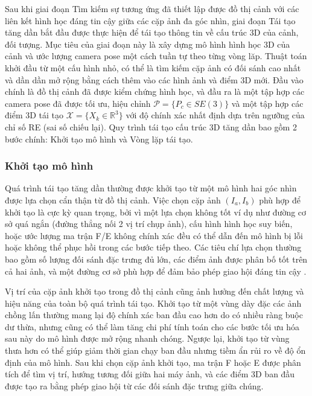 Sau khi giai đoạn Tìm kiếm sự tương ứng đã thiết lập được đồ thị cảnh với các liên kết hình học đáng tin cậy giữa các cặp ảnh đa góc nhìn, giai đoạn Tái tạo tăng dần bắt đầu được thực hiện để tái tạo thông tin về cấu trúc 3D của cảnh, đối tượng. Mục tiêu của giai đoạn này là xây dựng mô hình hình học 3D của cảnh và ước lượng camera pose một cách tuần tự theo từng vòng lăp. Thuật toán khởi đầu từ một cấu hình nhỏ, có thể là tìm kiếm cặp ảnh có đối sánh cao nhất và dần dần mở rộng bằng cách thêm vào các hình ảnh và điểm 3D mới. Đầu vào chính là đồ thị cảnh đã được kiểm chứng hình học, và đầu ra là một tập hợp các camera pose đã được tối ưu, hiệu chỉnh  $\mathcal{P} = \{P_c \in SE(3)\}$ và một tập hợp các điểm 3D tái tạo $\mathcal{X} = \{X_k \in \mathbb{R}^3\}$ với độ chính xác nhất định dựa trên ngưỡng của chỉ số RE (sai số chiếu lại). Quy trình tái tạo cấu trúc 3D tăng dần bao gồm 2 bước chính: Khởi tạo mô hình và Vòng lặp tái tạo.

\subsubsection{Khởi tạo mô hình }
Quá trình tái tạo tăng dần thường được khởi tạo từ một mô hình hai góc nhìn được lựa chọn cẩn thận từ đồ thị cảnh. Việc chọn cặp ảnh $(I_a, I_b)$ phù hợp để khởi tạo là cực kỳ quan trọng, bởi vì một lựa chọn không tốt ví dụ như đường cơ sở quá ngắn (đường thẳng nối 2 vị trí chụp ảnh), cấu hình hình học suy biến, hoặc ước lượng ma trận F/E không chính xác đều có thể dẫn đến mô hình bị lỗi hoặc không thể phục hồi trong các bước tiếp theo. Các tiêu chí lựa chọn thường bao gồm số lượng đối sánh đặc trưng đủ lớn, các điểm ảnh được phân bố tốt trên cả hai ảnh, và một đường cơ sở phù hợp để đảm bảo phép giao hội đáng tin cậy \cite{Beder06Determining, Snavely08Thesis}.

Vị trí của cặp ảnh khởi tạo trong đồ thị cảnh cũng ảnh hưởng đến chất lượng và hiệu năng của toàn bộ quá trình tái tạo. Khởi tạo từ một vùng dày đặc các ảnh chồng lấn thường mang lại độ chính xác ban đầu cao hơn do có nhiều ràng buộc dư thừa, nhưng cũng có thể làm tăng chi phí tính toán cho các bước tối ưu hóa sau này do mô hình được mở rộng nhanh chóng. Ngược lại, khởi tạo từ vùng thưa hơn có thể giúp giảm thời gian chạy ban đầu nhưng tiềm ẩn rủi ro về độ ổn định của mô hình. Sau khi chọn cặp ảnh khởi tạo, ma trận F hoặc E được phân tích để tìm vị trí, hướng tương đối giữa hai máy ảnh, và các điểm 3D ban đầu được tạo ra bằng phép giao hội từ các đối sánh đặc trưng giữa chúng.

